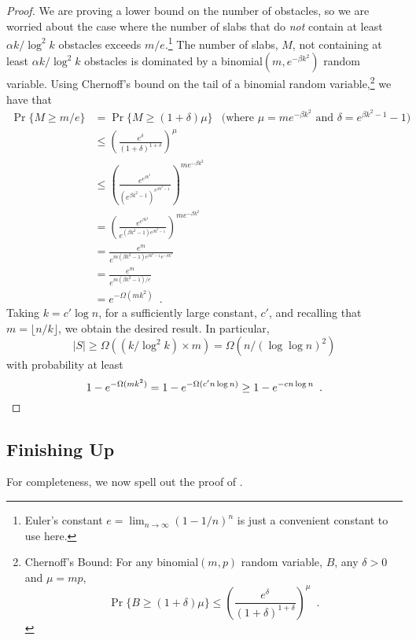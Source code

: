 \documentclass{patmorin}
\begin{document}
\begin{proof}
  We are proving a lower bound on the number of obstacles, so we are
  worried about the case where the number of slabs that do \emph{not}
  contain at least $\alpha k/\log^2 k$ obstacles exceeds $m/e$.\footnote{Euler's constant $e=\lim_{n\rightarrow \infty} (1-1/n)^n$ is just a convenient
  constant to use here.}
  The number of slabs, $M$, not containing at least $\alpha k/\log^2 k$
  obstacles is dominated by a binomial$(m,e^{-\beta k^2})$ random
  variable.
  Using Chernoff's bound on the tail of a binomial random
  variable,\footnote{%
    Chernoff's Bound: For any binomial$(m,p)$ random variable, $B$,
    any $\delta>0$ and $\mu=mp$, 
    \[ \Pr\{B\ge (1+\delta)\mu\}
       \le \left(\frac{e^{\delta}}{(1+\delta)^{1+\delta}}\right)^{\mu} 
         \enspace . 
    \]
  }
  we have that
  \begin{align*}
    \Pr\{M \ge m/e\} & = \Pr\{M\ge (1+\delta)\mu\}
      & \text{(where $\mu=me^{-\beta k^2}$ and $\delta=e^{\beta k^2-1}-1$)} \\
      & \le \left(\frac{e^{\delta}}{(1+\delta)^{1+\delta}}\right)^{\mu} \\
      & \le \left(\frac{e^{e^{\beta k^2}}}{(e^{\beta k^2-1})^{e^{\beta k^2-1}}}\right)^{me^{-\beta k^2}}\\
      & = \left(\frac{e^{e^{\beta k^2}}}{e^{(\beta k^2-1)e^{\beta k^2-1}}}\right)^{me^{-\beta k^2}}\\
      & = \frac{e^{m}}{e^{m(\beta k^2-1)e^{\beta k^2-1}e^{-\beta k^2}}} \\
      & = \frac{e^{m}}{e^{m(\beta k^2-1)/e}} \\
      & = e^{-\Omega(mk^2)} \enspace .
  \end{align*}
  Taking $k=c'\log n$, for a sufficiently large constant, $c'$, and
  recalling that $m=\lfloor n/k\rfloor$, we obtain
  the desired result.  In particular,
  \[
      |S| \ge \Omega\left(\left(k/\log^2 k\right)\times m \right)
        = \Omega\left(n/(\log\log n)^2\right)
  \]
  with probability at least
  \[
      1-e^{-\Omega(mk^2)} = 1-e^{-\Omega(c'n\log n)} \ge 1-e^{-cn\log n} \enspace . \qedhere
  \]
\end{proof}

\subsection{Finishing Up}

For completeness, we now spell out the proof of .
\end{document}
